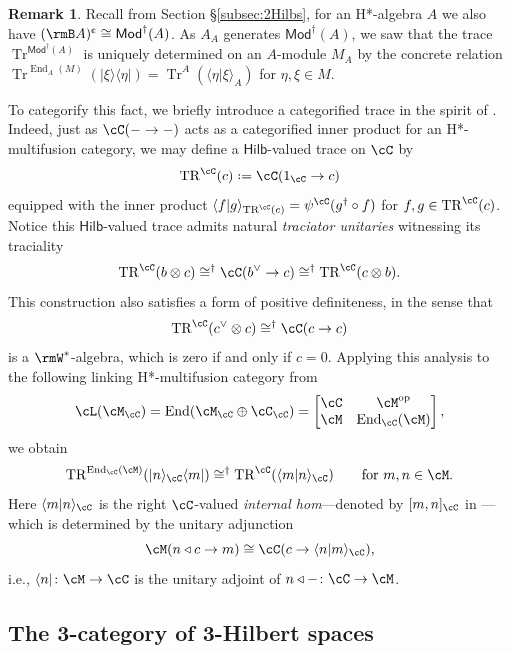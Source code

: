 \documentclass[12pt, reqno]{amsart}
\DeclareMathOperator{\End}{End}
\newcommand{\op}{\mathrm{op}}
\DeclareMathOperator{\Tr}{Tr}
\renewcommand{\cent}{\textup{\textcent}}
\newcommand{\Mod}{\mathsf{Mod}}
\newcommand{\Hilb}{\mathsf{Hilb}}
\theoremstyle{plain}
\theoremstyle{definition}
\newtheorem{rem}[thm]{Remark}
\newcommand{\coloneq}{:=}
\def\coloneq{\mathrel{\vcenter{\baselineskip0.55ex\lineskiplimit0pt\hbox{\upshape.}\hbox{\upshape.}}}=}
\let\coloneqq\coloneq
\begin{document}
\begin{rem}
Recall from Section \S \ref{subsec:2Hilbs}, for an H*-algebra $A$ we also have $(\rmB A)^\cent \cong \Mod^\dag(A)$. As $A_A$ generates $\Mod^\dag(A)$, we saw that the trace $\Tr^{\Mod^\dag(A)}$ is uniquely determined on an $A$-module $M_A$ by the concrete relation $\Tr^{\End_A(M)}(|\xi \rangle \langle \eta | ) = \Tr^A(\langle \eta | \xi \rangle_A)$ for $\eta,\xi \in M$. 

To categorify this fact, we briefly introduce a categorified trace in the spirit of \cite{MR3578212,MR4750417}. Indeed, just as $\cC( - \to - )$ acts as a categorified inner product for an H*-multifusion category, we may define a $\Hilb$-valued trace on $\cC$ by
$$
\operatorname{TR}^\cC(c) \coloneqq \cC(1_\cC \to c)
$$
equipped with the inner product $\langle f | g \rangle_{\operatorname{TR}^\cC(c)} = \psi^\cC(g^\dag \circ f)$ for $f,g \in \operatorname{TR}^\cC(c)$. Notice this $\Hilb$-valued trace admits natural \emph{traciator unitaries} witnessing its traciality
\[
\operatorname{TR}^\cC(b \otimes c) 
\cong^\dag 
\cC(b^\vee \to c)
\cong^\dag
\operatorname{TR}^\cC(c \otimes b). 
\]
This construction also satisfies a form of positive definiteness, in the sense that
\[
\operatorname{TR}^\cC(c^\vee \otimes c) \cong^\dag \cC(c \to c) 
\]
is a $\rmW^*$-algebra, which is zero if and only if $c=0$.
Applying this analysis to the following linking H*-multifusion category from \cite[Sub-Example 3.21]{MR5078555} 
\[
\cL(\cM_\cC) = \End(\cM_\cC \oplus \cC_\cC) = 
\begin{bmatrix}
\cC & \cM^\op
\\
\cM & \End_\cC(\cM)
\end{bmatrix}
, 
\]
we obtain 
\[
\operatorname{TR}^{\End_\cC(\cM)}(|n \rangle_\cC \langle m |)
\cong^\dag 
\operatorname{TR}^{\cC}(\langle m | n \rangle_\cC) \qquad\text{for } m,n \in \cM.
\]
Here $\langle m|n\rangle_\cC$ is the right $\cC$-valued \emph{internal hom}---denoted by $[m,n]_\cC$ in \cite{MR5078555}---which is determined by the unitary adjunction
\[
    \cM(n\triangleleft c\to m)\cong\cC(c\to \langle n|m\rangle_\cC),
\]
i.e., $\langle n|\colon\cM\to\cC$ is the unitary adjoint of $n\triangleleft -\colon \cC\to \cM$.
\end{rem}


\subsection{The 3-category of 3-Hilbert spaces}
\end{document}
